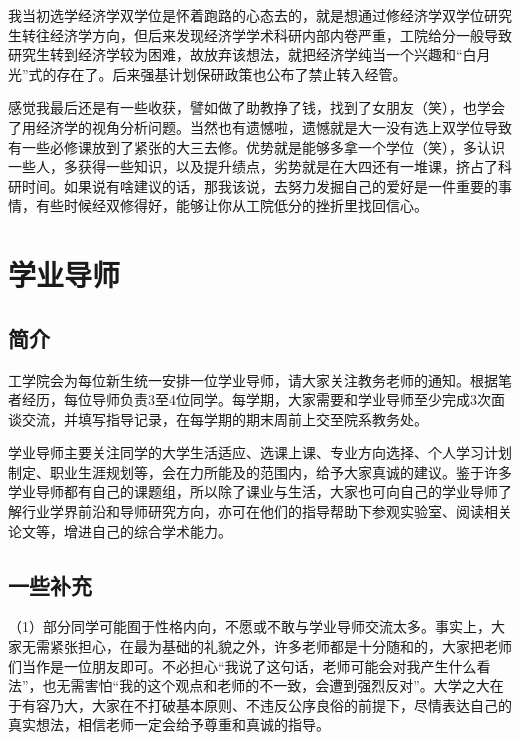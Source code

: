 \vspace{10pt}

我当初选学经济学双学位是怀着跑路的心态去的，就是想通过修经济学双学位研究生转往经济学方向，但后来发现经济学学术科研内部内卷严重，工院给分一般导致研究生转到经济学较为困难，故放弃该想法，就把经济学纯当一个兴趣和“白月光”式的存在了。后来强基计划保研政策也公布了禁止转入经管。

\vspace{10pt}

感觉我最后还是有一些收获，譬如做了助教挣了钱，找到了女朋友（笑），也学会了用经济学的视角分析问题。当然也有遗憾啦，遗憾就是大一没有选上双学位导致有一些必修课放到了紧张的大三去修。优势就是能够多拿一个学位（笑），多认识一些人，多获得一些知识，以及提升绩点，劣势就是在大四还有一堆课，挤占了科研时间。如果说有啥建议的话，那我该说，去努力发掘自己的爱好是一件重要的事情，有些时候经双修得好，能够让你从工院低分的挫折里找回信心。

\section{学业导师}

\subsection{简介}

工学院会为每位新生统一安排一位学业导师，请大家关注教务老师的通知。根据笔者经历，每位导师负责3至4位同学。每学期，大家需要和学业导师至少完成3次面谈交流，并填写指导记录，在每学期的期末周前上交至院系教务处。

\vspace{10pt}

学业导师主要关注同学的大学生活适应、选课上课、专业方向选择、个人学习计划制定、职业生涯规划等，会在力所能及的范围内，给予大家真诚的建议。鉴于许多学业导师都有自己的课题组，所以除了课业与生活，大家也可向自己的学业导师了解行业学界前沿和导师研究方向，亦可在他们的指导帮助下参观实验室、阅读相关论文等，增进自己的综合学术能力。

\subsection{一些补充}

（1）部分同学可能囿于性格内向，不愿或不敢与学业导师交流太多。事实上，大家无需紧张担心，在最为基础的礼貌之外，许多老师都是十分随和的，大家把老师们当作是一位朋友即可。不必担心“我说了这句话，老师可能会对我产生什么看法”，也无需害怕“我的这个观点和老师的不一致，会遭到强烈反对”。大学之大在于有容乃大，大家在不打破基本原则、不违反公序良俗的前提下，尽情表达自己的真实想法，相信老师一定会给予尊重和真诚的指导。

